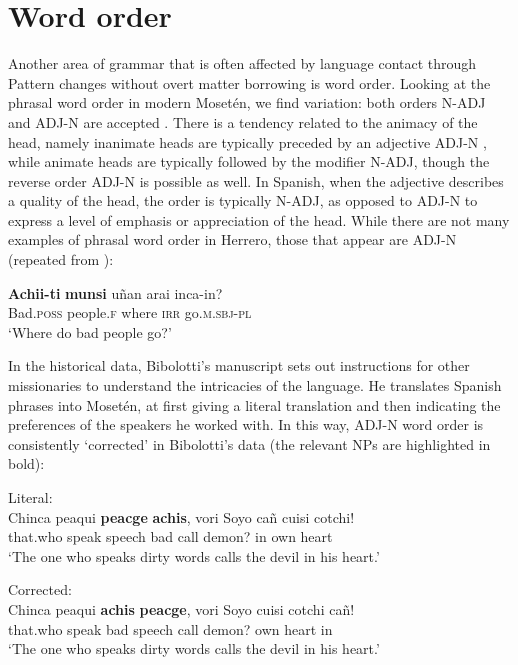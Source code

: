 \documentclass[output=paper,colorlinks,citecolor=brown
]{langscibook}
\begin{document}
\section{Word order}
Another area of grammar that is often affected by language contact through Pattern changes without overt matter borrowing is word order. Looking at the phrasal word order in modern Mosetén, we find variation: both orders N-ADJ and ADJ-N are accepted \citep[p.~103]{sakel2004grammar}. There is a tendency related to the animacy of the head, namely inanimate heads are typically preceded by an adjective ADJ-N , while animate heads are typically followed by the modifier N-ADJ, though the reverse order ADJ-N is possible as well. In Spanish, when the adjective describes a quality of the head, the order is typically N-ADJ, as opposed to ADJ-N to express a level of emphasis or appreciation of the head.
While there are not many examples of phrasal word order in Herrero, those that appear are ADJ-N (repeated from ):

\ea \label{sakel_example_14}
\gll \textbf{Achii-ti} 	\textbf{munsi} 		uñan 	arai  	inca-in?\\
     Bad.\textsc{poss}	people.\textsc{f}	where	\textsc{irr} 	go.\textsc{m.sbj-pl}\\
\glt ‘Where do bad people go?’
\z	

In the historical data, Bibolotti’s manuscript sets out instructions for other missionaries to understand the intricacies of the language. He translates Spanish phrases into Mosetén, at first giving a literal translation and then indicating the preferences of the speakers he worked with. In this way, ADJ-N word order is consistently ‘corrected’ in Bibolotti’s data (the relevant NPs are highlighted in bold): 


\ea \label{sakel_example_15}Literal:\\
\gll Chinca  peaqui  \textbf{peacge}  \textbf{achis},  vori    Soyo    cañ cuisi   cotchi!\\
     that.who   speak    speech  bad	call   demon?    in  own heart\\
\glt ‘The one who speaks dirty words calls the devil in his heart.’
\z	


\ea \label{sakel_example_16}Corrected:\\
\gll Chinca  peaqui  \textbf{achis}  \textbf{peacge},  vori    Soyo   cuisi   cotchi  cañ!\\
     that.who   speak    bad    speech	call   demon?  own heart   in\\
\glt ‘The one who speaks dirty words calls the devil in his heart.’
\z	
\end{document}
